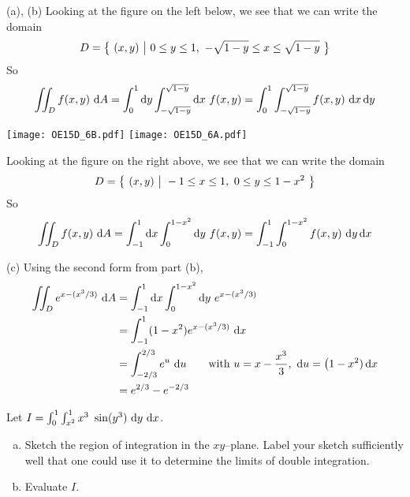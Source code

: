 \begin{solution}
(a), (b) 
Looking at the figure on the left below, we see that we can write
the domain
\begin{equation*}
D = \big\{ \ (x,y)\ \big|\ 0\le y\le 1,\ -\sqrt{1-y}\le x\le\sqrt{1-y}\ \big\}
\end{equation*}
So
\begin{equation*}
\dblInt_D f(x,y)\ \dee{A}
=\int_0^1\dee{y} \int_{-\sqrt{1-y}}^{\sqrt{1-y}}\dee{x}\ f(x,y)
=\int_0^1 \int_{-\sqrt{1-y}}^{\sqrt{1-y}} f(x,y)\ \dee{x}\,\dee{y}
\end{equation*}

\begin{center}
\texttt{[image: OE15D\_6B.pdf]}\qquad
\texttt{[image: OE15D\_6A.pdf]}
\end{center}

Looking at the figure on the right above, we see that we can write
the domain
\begin{equation*}
D = \Set{(x,y)}{-1\le x\le 1,\ 0\le y\le 1-x^2}
\end{equation*}
So
\begin{equation*}
\iint_D f(x,y)\ \mathrm{d}A
=\int_{-1}^1\mathrm{d}x \int_0^{1-x^2}\mathrm{d}y\ f(x,y)
=\int_{-1}^1 \int_0^{1-x^2} f(x,y)\ \mathrm{d}y\,\mathrm{d}x
\end{equation*}

(c) Using the second form from part (b),
\begin{align*}
\dblInt_D e^{x-(x^3/3)}\ \dee{A}
&=\int_{-1}^1\dee{x} \int_0^{1-x^2}\dee{y}\ e^{x-(x^3/3)} \\
&=\int_{-1}^1 (1-x^2) e^{x-(x^3/3)}\ \dee{x} \\
&=\int_{-2/3}^{2/3} e^u\ \dee{u} \qquad\text{with }
   u=x -\frac{x^3}{3},\ 
   \dee{u} = \big(1-x^2)\,\dee{x} \\
&= e^{2/3}-e^{-2/3}
\end{align*}
\end{solution}

\begin{question}[M200 2016D] %
Let $I=\int_0^1 \int_{x^2}^1 x^3\ \sin(y^3)\ \dee{y}\ \dee{x}$.
\begin{enumerate}[(a)]
\item
Sketch the region of integration in the $xy$--plane. Label your
sketch sufficiently well that one could use it to determine the
limits of double integration.

\item
Evaluate $I$.

\end{enumerate}
\end{question}

